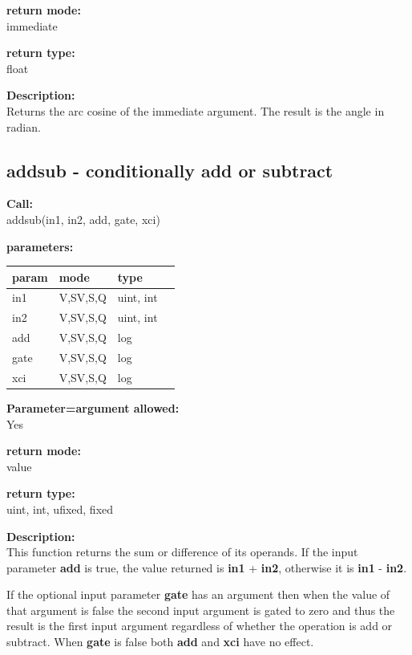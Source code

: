         {\bf return mode:} \\
        immediate

        {\bf return type:} \\
        float
        
        {\bf Description:} \\
        Returns the arc cosine of the immediate argument. The result is the
        angle in radian.


    \subsection{addsub - conditionally add or subtract}\label{sec:ifaddsub}

        {\bf Call:} \\
        addsub(in1, in2, add, gate, xci)
        
        {\bf parameters:} \\
        \begin{tabular}{| l | l | l | l |}
        \hline
        param  & mode & type & \\
        \hline \hline
        in1  & V,SV,S,Q & uint, int & \\ \hline
        in2  & V,SV,S,Q & uint, int & \\ \hline
        add  & V,SV,S,Q & log       & \\ \hline
        gate & V,SV,S,Q & log       & \\ \hline
        xci  & V,SV,S,Q & log       & \\ \hline
        \end{tabular}
        
        {\bf Parameter=argument allowed:} \\
        Yes
        
        {\bf return mode:} \\
        value

        {\bf return type:} \\
        uint, int, ufixed, fixed
        
        {\bf Description:} \\
        This function returns the sum or difference of its operands. If
        the input parameter {\bf add} is true, the value returned is {\bf
        in1} + {\bf in2}, otherwise it is {\bf in1} - {\bf in2}.
        
        If the optional input parameter {\bf gate} has an argument then when the
        value of that argument is false the second input argument is gated to zero
        and thus the result is the first input argument regardless of whether the
        operation is add or subtract. When {\bf gate} is false both {\bf add}
        and {\bf xci} have no effect.
        
